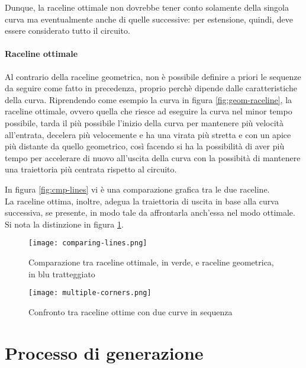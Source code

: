 Dunque, la raceline ottimale non dovrebbe tener conto solamente della singola curva ma eventualmente
anche di quelle successive: per estensione, quindi, deve essere considerato tutto il circuito.

\paragraph{Raceline ottimale}
Al contrario della raceline geometrica, non è possibile definire a priori le sequenze da seguire come
fatto in precedenza, proprio perchè dipende dalle caratteristiche della curva.
Riprendendo come esempio la curva in figura \ref{fig:geom-raceline}, la raceline ottimale, ovvero quella
che riesce ad eseguire la curva nel minor tempo possibile, tarda il più possibile l'inizio della curva
per mantenere più velocità all'entrata, decelera più velocemente e ha una virata più stretta e con un
apice più distante da quello geometrico, così facendo si ha la possibilità di aver più tempo per
accelerare di nuovo all'uscita della curva con la possibità di mantenere una traiettoria più centrata
rispetto al circuito.

In figura \ref{fig:cmp-lines} vi è una comparazione grafica tra le due raceline.\\
La raceline ottima, inoltre, adegua la traiettoria di uscita in base alla curva successiva, se presente,
in modo tale da affrontarla anch'essa nel modo ottimale. Si nota la distinzione in figura
\ref{fig:cmp-opt-lines}.

\begin{figure}[h]
	\begin{minipage}[c]{0.45\textwidth}
		\texttt{[image: comparing-lines.png]}
		\caption{Comparazione tra raceline ottimale, in verde, e raceline geometrica, in blu tratteggiato}\label{fig:cmp-lines}
	\end{minipage}\hfill
	\begin{minipage}[c]{0.45\textwidth}
		\texttt{[image: multiple-corners.png]}
		\caption{Confronto tra raceline ottime con due curve in sequenza}\label{fig:cmp-opt-lines}
	\end{minipage}
\end{figure}


\section{Processo di generazione}

